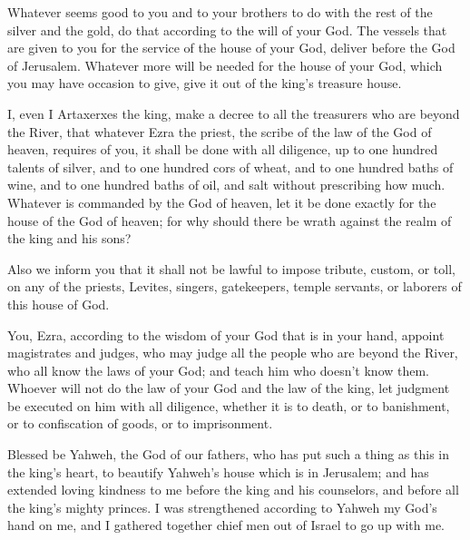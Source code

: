 {Whatever seems good to you and to your brothers to do with the rest of the silver and the gold, do that according to the will of your God.
The vessels that are given to you for the service of the house of your God, deliver before the God of Jerusalem.
Whatever more will be needed for the house of your God, which you may have occasion to give, give it out of the king’s treasure house.
\par }{\PI {}I, even I Artaxerxes the king, make a decree to all the treasurers who are beyond the River, that whatever Ezra the priest, the scribe of the law of the God of heaven, requires of you, it shall be done with all diligence,
up to one hundred talents of silver, and to one hundred cors of wheat, and to one hundred baths of wine, and to one hundred baths of oil, and salt without prescribing how much.
Whatever is commanded by the God of heaven, let it be done exactly for the house of the God of heaven; for why should there be wrath against the realm of the king and his sons?
\par }{\PI {}Also we inform you that it shall not be lawful to impose tribute, custom, or toll, on any of the priests, Levites, singers, gatekeepers, temple servants, or laborers of this house of God.
\par }{\PI {}You, Ezra, according to the wisdom of your God that is in your hand, appoint magistrates and judges, who may judge all the people who are beyond the River, who all know the laws of your God; and teach him who doesn’t know them.
Whoever will not do the law of your God and the law of the king, let judgment be executed on him with all diligence, whether it is to death, or to banishment, or to confiscation of goods, or to imprisonment.
\par }{\BB \par }{\PP {}Blessed be Yahweh, the God of our fathers, who has put such a thing as this in the king’s heart, to beautify Yahweh’s house which is in Jerusalem;
and has extended loving kindness to me before the king and his counselors, and before all the king’s mighty princes. I was strengthened according to Yahweh my God’s hand on me, and I gathered together chief men out of Israel to go up with me.

}
